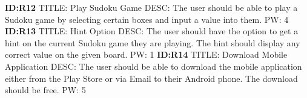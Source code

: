 \documentclass{article}
\begin{document}
\textbf{ID:R12} \newline TITLE: Play Sudoku Game \newline DESC: The user should be able to play a Sudoku game by selecting certain boxes and input a value into them. \newline PW: 4 \newline \newline
\textbf{ID:R13} \newline TITLE: Hint Option \newline DESC: The user should have the option to get a hint on the current Sudoku game they are playing. The hint should display any correct value on the given board. \newline PW: 1 \newline \newline
\textbf{ID:R14} \newline TITLE: Download Mobile Application \newline DESC: The user should be able to download the mobile application either from the Play Store or via Email to their Android phone. The download should be free. \newline PW: 5 \newline 
\end{document}
